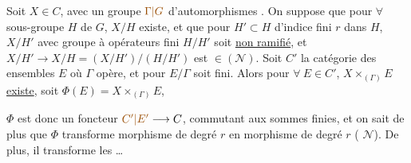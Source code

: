 Soit $X\in C$, avec un groupe $\unsure{\Gamma|G}$ d'automorphismes . On suppose que pour $\forall$ sous-groupe $H$ de $G$,  $X/H$ existe, et que pour $H'\subset H$  d'indice fini $r$ dans $H$,   $X/H'$ avec groupe à opérateurs fini $H/H'$ soit \uline{non ramifié}, et $X/H'\longrightarrow X/H=(X/H')/(H/H')$ est $\in(\mathcal N)$. Soit $C'$ la catégorie des ensembles $E$ où $\Gamma$ opère, et pour $E/\Gamma$ soit fini. Alors  pour $\forall\ E\in C'$, $X\times_{(\Gamma)}E$ \uline{existe}, soit $\Phi(E)=X\times_{(\Gamma)}E$,

$\Phi$ est donc un foncteur $\unsure{C'|E'}\longrightarrow C$, commutant aux sommes finies, et on sait de plus que $\Phi$ transforme morphisme de degré $r$ en morphisme de degré $r$ ( $\mathcal N$). De plus, il transforme   les \ldots
